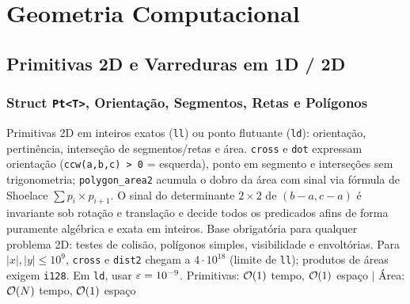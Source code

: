 \section{Geometria Computacional}

\subsection{Primitivas 2D e Varreduras em 1D / 2D}

\subsubsection{Struct \texttt{Pt<T>}, Orientação, Segmentos, Retas e Polígonos}
\algobox
  {Primitivas 2D em inteiros exatos (\texttt{ll}) ou ponto flutuante (\texttt{ld}): orientação, pertinência, interseção de segmentos/retas e área.}
  {\texttt{cross} e \texttt{dot} expressam orientação (\texttt{ccw(a,b,c) > 0} = esquerda), ponto em segmento e interseções sem trigonometria; \texttt{polygon\_area2} acumula o dobro da área com sinal via fórmula de Shoelace $\sum p_i \times p_{i+1}$.}
  {O sinal do determinante $2 \times 2$ de $(b-a, c-a)$ é invariante sob rotação e translação e decide todos os predicados afins de forma puramente algébrica e exata em inteiros.}
  {Base obrigatória para qualquer problema 2D: testes de colisão, polígonos simples, visibilidade e envoltórias.}
  {Para $|x|, |y| \le 10^9$, \texttt{cross} e \texttt{dist2} chegam a $4 \cdot 10^{18}$ (limite de \texttt{ll}); produtos de áreas exigem \texttt{i128}. Em \texttt{ld}, usar $\varepsilon = 10^{-9}$.}
  {Primitivas: $\mathcal{O}(1)$ tempo, $\mathcal{O}(1)$ espaço $\mid$ Área: $\mathcal{O}(N)$ tempo, $\mathcal{O}(1)$ espaço}

